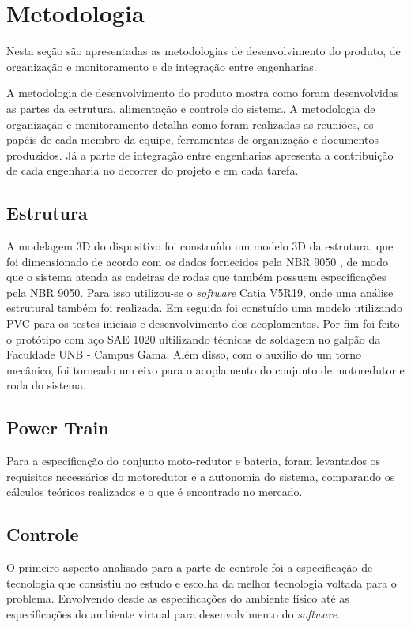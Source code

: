 \chapter[Metodologia]{Metodologia}

Nesta seção são apresentadas as metodologias de desenvolvimento do produto, de organização e monitoramento e de integração entre engenharias.

A metodologia de desenvolvimento do produto mostra como foram desenvolvidas as partes da estrutura, alimentação e controle do sistema. A metodologia de organização e monitoramento detalha como foram realizadas as reuniões, os papéis de cada membro da equipe, ferramentas de organização e documentos produzidos. Já a parte de integração entre engenharias apresenta a contribuição de cada engenharia no decorrer do projeto e em cada tarefa.

\section{Estrutura}

A modelagem 3D do dispositivo foi construído um modelo 3D da estrutura, que foi dimensionado de acordo com os dados fornecidos pela NBR 9050 \cite{nbr9050}, de modo que o sistema atenda as cadeiras de rodas que também possuem especificações pela NBR 9050.
Para isso utilizou-se o \textit{software} Catia V5R19, onde uma análise estrutural também foi realizada. Em seguida foi constuído uma modelo utilizando PVC para os testes iniciais e desenvolvimento dos acoplamentos. Por fim foi feito o protótipo com aço SAE 1020 ultilizando técnicas de soldagem no galpão da Faculdade UNB - Campus Gama. Além disso, com o auxílio do um torno mecânico, foi torneado um eixo para o acoplamento do conjunto de motoredutor e roda do sistema.

\section{Power Train}

Para a especificação do conjunto moto-redutor e bateria, foram levantados os requisitos necessários do motoredutor e a autonomia do sistema, comparando os cálculos teóricos realizados e o que é encontrado no mercado.

\section{Controle}

	O primeiro aspecto analisado para a parte de controle foi a especificação de tecnologia que consistiu no estudo e escolha da melhor tecnologia voltada para o problema. Envolvendo desde as especificações do ambiente físico até as especificações do ambiente virtual para desenvolvimento do \textit{software}.

